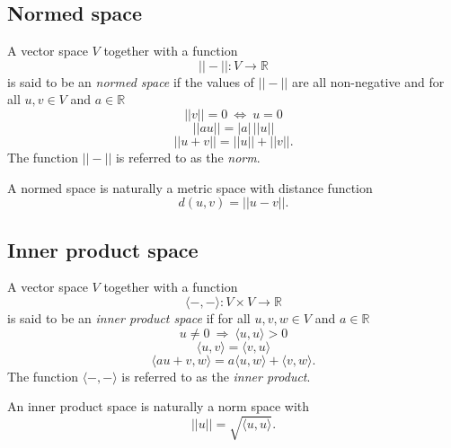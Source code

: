 \documentclass{amsart}
\begin{document}
	\subsection*{Normed space} \label{normed_space}
	A vector space $V$ together with a function	
	\begin{equation*}	
	||-|| : V \to \mathbb R	
	\end{equation*}	
	is said to be an \textit{normed space} if the values of $||-||$ are all non-negative and for all $u,v \in V$ and $a \in \mathbb R$	
	\begin{equation*}	
	||v|| = 0\ \Leftrightarrow\ u = 0	
	\end{equation*}	
	\begin{equation*}	
	||a u || = |a|\, ||u||	
	\end{equation*}	
	\begin{equation*}	
	||u+v|| = ||u|| + ||v||.	
	\end{equation*}	
	The function $||-||$ is referred to as the \textit{norm}.
	
	A normed space is naturally a
	metric space with distance function	
	\begin{equation*}	
	d(u,v) = ||u-v||.	
	\end{equation*}
	
	\subsection*{Inner product space} \label{inner_product_space}	
	
	A vector space $V$ together with a function
	\begin{equation*}	
	\langle -, - \rangle : V \times V \to \mathbb R	
	\end{equation*}
	is said to be an \textit{inner product space} if for all $u,v,w \in V$ and $a \in \mathbb R$
	\begin{equation*}	
	u \neq 0\ \Rightarrow\ \langle u, u \rangle > 0 	
	\end{equation*}	
	\begin{equation*}	
	\langle u, v\rangle = \langle v, u\rangle	
	\end{equation*}
	\begin{equation*}
	\langle au+v, w \rangle = a\langle u, w \rangle + \langle v, w \rangle.	
	\end{equation*}	
	The function $\langle -, - \rangle$ is referred to as the \textit{inner product}.
	
	An inner product space is naturally a norm space with	
	\begin{equation*}	
	||u|| = \sqrt{\langle u, u \rangle}.
	\end{equation*}
	
\end{document}
